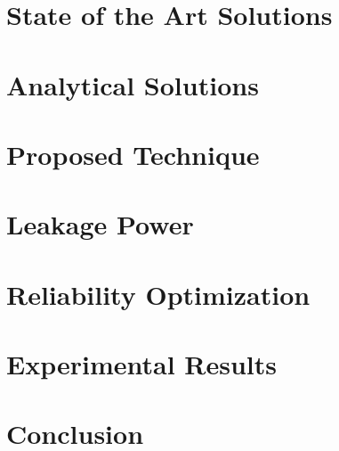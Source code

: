 \documentclass{sig-alternate}
\begin{document}
  \section{State of the Art Solutions} \label{sec:hotspot-solution}
  

  \section{Analytical Solutions} \label{sec:analytical-solution}
  

  \section{Proposed Technique} \label{sec:condensed-equation}
  

  \section{Leakage Power} \label{sec:leakage}
  

  \section{Reliability Optimization} \label{sec:reliability}
  

  \section{Experimental Results} \label{sec:results}
  

  \section{Conclusion} \label{sec:conclusion}
  

%
  
\end{document}

